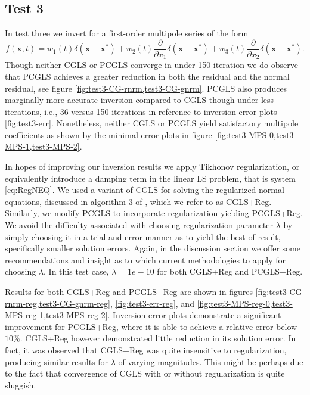 \subsection{Test 3}

In test three we invert for a first-order multipole series of the form
\begin{equation}\label{eq:test3MPS}
	f(\mathbf x,t) = w_1(t) \delta(\mathbf x-\mathbf x^*) 
		+ w_2(t) \frac{\partial}{\partial x_1}\delta(\mathbf x-\mathbf x^*)
		+ w_3(t) \frac{\partial}{\partial x_2}\delta(\mathbf x-\mathbf x^*).
\end{equation}
Though neither CGLS or PCGLS converge in under 150 iteration we do observe that PCGLS achieves a greater reduction in both the residual and the normal residual, see figure \ref{fig:test3-CG-rnrm,test3-CG-gnrm}.
PCGLS also produces marginally more accurate inversion compared to CGLS though under less iterations, i.e., 36 versus 150 iterations in reference to inversion error plots \ref{fig:test3-err}.
Nonetheless, neither CGLS or PCGLS yield satisfactory multipole coefficients as shown by the minimal error plots in figure \ref{fig:test3-MPS-0,test3-MPS-1,test3-MPS-2}.

In hopes of improving our inversion results we apply Tikhonov regularization, or equivalently introduce a damping term in the linear LS problem, that is system \ref{eq:RegNEQ}.
We used a variant of CGLS for solving the regularized normal equations, discussed in algorithm 3 of \cite{Frommer:99}, which we refer to as CGLS+Reg.
Similarly, we modify PCGLS to incorporate regularization yielding PCGLS+Reg.
We avoid the difficulty associated with choosing regularization parameter $\lambda$ by simply choosing it in a trial and error manner as to yield the best of result, specifically smaller solution errors. 
Again, in the discussion section we offer some recommendations and insight as to which current methodologies to apply for choosing $\lambda$.
In this test case, $\lambda= 1e-10$ for both CGLS+Reg and PCGLS+Reg.

Results for both CGLS+Reg and PCGLS+Reg are shown in figures \ref{fig:test3-CG-rnrm-reg,test3-CG-gnrm-reg}, \ref{fig:test3-err-reg}, and \ref{fig:test3-MPS-reg-0,test3-MPS-reg-1,test3-MPS-reg-2}.
Inversion error plots demonstrate a significant improvement for PCGLS+Reg, where it is able to achieve a relative error below $10\%$.
CGLS+Reg however demonstrated little reduction in its solution error.
In fact, it was observed that CGLS+Reg was quite insensitive to regularization, producing similar results for $\lambda$ of varying magnitudes.
This might be perhaps due to the fact that convergence of CGLS with or without regularization is quite sluggish.

